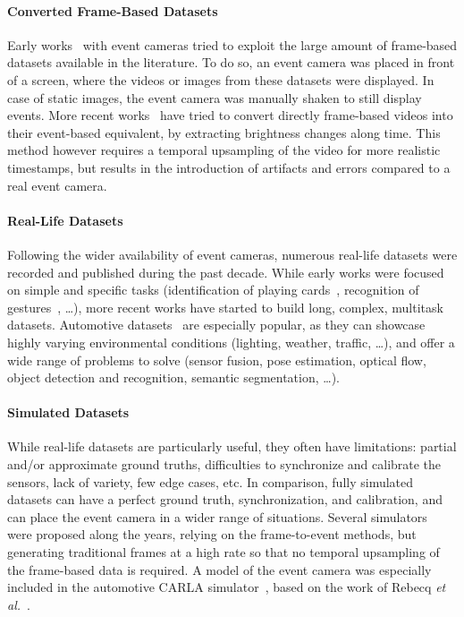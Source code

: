 \paragraph{Converted Frame-Based Datasets}
Early works~\cite{Orchard2015ConvertingSI,Tan2015BenchmarkingNV} with event cameras tried to exploit the large amount of frame-based datasets available in the literature. To do so, an event camera was placed in front of a screen, where the videos or images from these datasets were displayed. In case of static images, the event camera was manually shaken to still display events. More recent works~\cite{Gehrig2019VideoTE,Hu2021v2eFV,Joubert2021EventCS} have tried to convert directly frame-based videos into their event-based equivalent, by extracting brightness changes along time. This method however requires a temporal upsampling of the video for more realistic timestamps, but results in the introduction of artifacts and errors compared to a real event camera.

\paragraph{Real-Life Datasets}
Following the wider availability of event cameras, numerous real-life datasets were recorded and published during the past decade. While early works were focused on simple and specific tasks (identification of playing cards~\cite{SerranoGotarredona2015PokerDVSAM}, recognition of gestures~\cite{Amir2017ALP}, \dots), more recent works have started to build long, complex, multitask datasets. Automotive datasets~\cite{Perot2020LearningTD,Zhu2018TheMS,Gehrig2021DSECAS,Chaney2023M3EDMM} are especially popular, as they can showcase highly varying environmental conditions (lighting, weather, traffic, \dots), and offer a wide range of problems to solve (sensor fusion, pose estimation, optical flow, object detection and recognition, semantic segmentation, \dots).

\paragraph{Simulated Datasets}
While real-life datasets are particularly useful, they often have limitations: partial and/or approximate ground truths, difficulties to synchronize and calibrate the sensors, lack of variety, few edge cases, etc. In comparison, fully simulated datasets can have a perfect ground truth, synchronization, and calibration, and can place the event camera in a wider range of situations. Several simulators~\cite{Mueggler2016TheED,Li2018InteriorNetMM,Rebecq2018ESIMAO} were proposed along the years, relying on the frame-to-event methods, but generating traditional frames at a high rate so that no temporal upsampling of the frame-based data is required. A model of the event camera was especially included in the automotive CARLA simulator~\cite{Dosovitskiy2017CARLAAO}, based on the work of Rebecq \textit{et al.}~\cite{Rebecq2018ESIMAO}.


